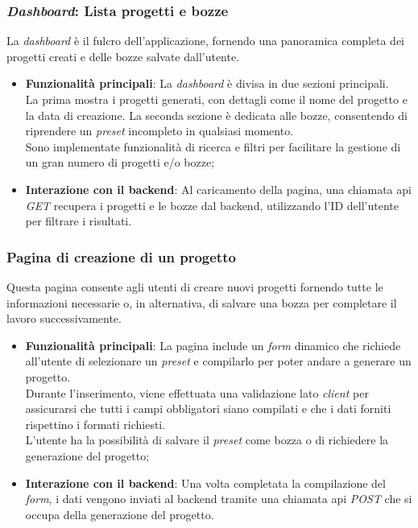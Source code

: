 \subsubsection{\textit{Dashboard}: Lista progetti e bozze}
La \textit{dashboard} è il fulcro dell'applicazione, fornendo una panoramica completa dei progetti creati e delle bozze salvate dall'utente.
\begin{itemize}
    \item \textbf{Funzionalità principali}: La \textit{dashboard} è divisa in due sezioni principali.\\
    La prima mostra i progetti generati, con dettagli come il nome del progetto e la data di creazione. La seconda sezione è dedicata alle bozze, consentendo di riprendere un \textit{preset} incompleto in qualsiasi momento.\\
    Sono implementate funzionalità di ricerca e filtri per facilitare la gestione di un gran numero di progetti e/o bozze;
    \item \textbf{Interazione con il \gls{backend}}: Al caricamento della pagina, una chiamata \gls{api} \textit{GET} recupera i progetti  e le bozze dal \gls{backend}, utilizzando l'ID dell'utente per filtrare i risultati.
\end{itemize}

\subsubsection{Pagina di creazione di un progetto}
Questa pagina consente agli utenti di creare nuovi progetti fornendo tutte le informazioni necessarie o, in alternativa, di salvare una bozza per completare il lavoro successivamente. 
\begin{itemize}
    \item \textbf{Funzionalità principali}: La pagina include un \textit{form} dinamico che richiede all'utente di selezionare un \textit{preset} e compilarlo per poter andare a generare un progetto.\\ 
    Durante l'inserimento, viene effettuata una validazione lato \textit{client} per assicurarsi che tutti i campi obbligatori siano compilati e che i dati forniti rispettino i formati richiesti. \\
    L'utente ha la possibilità di salvare il \textit{preset} come bozza o di richiedere la generazione del progetto;
    \item \textbf{Interazione con il \gls{backend}}: Una volta completata la compilazione del \textit{form}, i dati vengono inviati al \gls{backend} tramite una chiamata \gls{api} \textit{POST} che si occupa della generazione del progetto.\\
\end{itemize}

